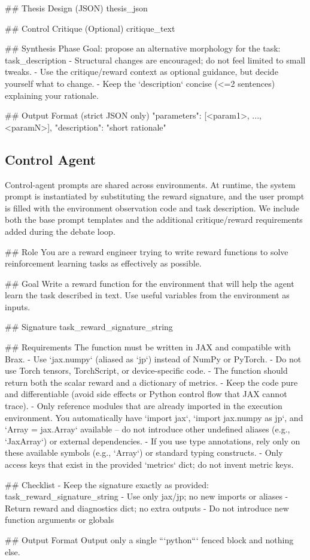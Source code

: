 \begin{promptbox}
## Thesis Design (JSON)
{thesis_json}

## Control Critique (Optional)
{critique_text}

## Synthesis Phase
Goal: propose an alternative morphology for the task: {task_description}
- Structural changes are encouraged; do not feel limited to small tweaks.
- Use the critique/reward context as optional guidance, but decide yourself what to change.
- Keep the `description` concise (<=2 sentences) explaining your rationale.

## Output Format (strict JSON only)
{
  "parameters": [<param1>, ..., <paramN>],
  "description": "short rationale"
}
\end{promptbox}

\subsection{Control Agent}
\label{app:control_prompts}
Control-agent prompts are shared across environments. At runtime, the system prompt is instantiated by substituting the reward signature, and the user prompt is filled with the environment observation code and task description. We include both the base prompt templates and the additional critique/reward requirements added during the debate loop.

\begin{promptbox}
## Role
You are a reward engineer trying to write reward functions to solve reinforcement learning tasks as effectively as possible.

## Goal
Write a reward function for the environment that will help the agent learn the task described in text.
Use useful variables from the environment as inputs.

## Signature
{task_reward_signature_string}

## Requirements
The function must be written in JAX and compatible with Brax.
- Use `jax.numpy` (aliased as `jp`) instead of NumPy or PyTorch.
- Do not use Torch tensors, TorchScript, or device-specific code.
- The function should return both the scalar reward and a dictionary of metrics.
- Keep the code pure and differentiable (avoid side effects or Python control flow that JAX cannot trace).
- Only reference modules that are already imported in the execution environment. You automatically have `import jax`, `import jax.numpy as jp`, and `Array = jax.Array` available -- do not introduce other undefined aliases (e.g., `JaxArray`) or external dependencies.
- If you use type annotations, rely only on these available symbols (e.g., `Array`) or standard typing constructs.
- Only access keys that exist in the provided `metrics` dict; do not invent metric keys.

## Checklist
- Keep the signature exactly as provided: {task_reward_signature_string}
- Use only jax/jp; no new imports or aliases
- Return reward and diagnostics dict; no extra outputs
- Do not introduce new function arguments or globals

## Output Format
Output only a single ```python``` fenced block and nothing else.
\end{promptbox}


